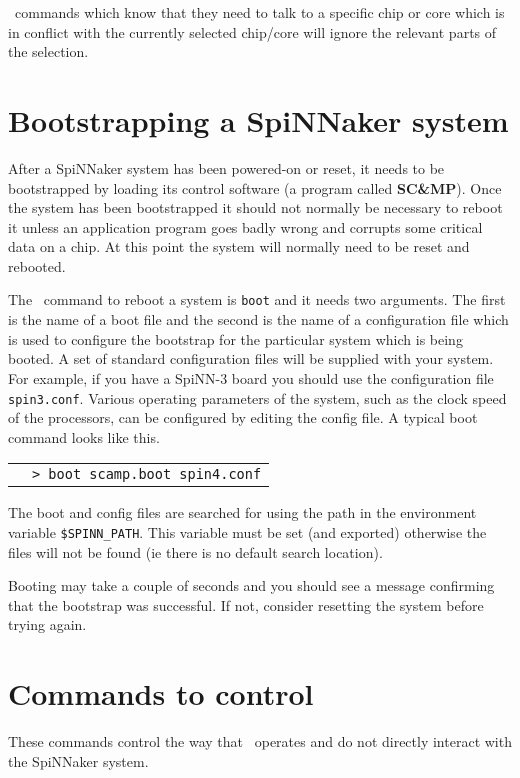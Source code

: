 \ybug\ commands which know that they need to talk to a specific chip or
core which is in conflict with the currently selected chip/core will
ignore the relevant parts of the selection.

\section{Bootstrapping a SpiNNaker system}

After a SpiNNaker system has been powered-on or reset, it needs to be
bootstrapped by loading its control software (a program
called \textbf{SC\&MP}). Once the system has been bootstrapped it
should not normally be necessary to reboot it unless an application
program goes badly wrong and corrupts some critical data on a chip. At
this point the system will normally need to be reset and rebooted.

The \ybug\ command to reboot a system is \texttt{boot} and it needs two
arguments. The first is the name of a boot file and the second is the
name of a configuration file which is used to configure the bootstrap
for the particular system which is being booted. A set of standard
configuration files will be supplied with your system. For example, if
you have a SpiNN-3 board you should use the configuration file
\texttt{spin3.conf}. Various operating parameters of the system, such
as the clock speed of the processors, can be configured by editing
the config file. A typical boot command looks like this.

\begin{tabular}{p{1cm} p{12cm}}
& \texttt{> boot scamp.boot spin4.conf}
\end{tabular}

The boot and config files are searched for using the path in the
environment variable \texttt{\$SPINN\_PATH}. This variable must be set
(and exported) otherwise the files will not be found (ie there is no
default search location).

Booting may take a couple of seconds and you should see a message
confirming that the bootstrap was successful. If not, consider
resetting the system before trying again.

\section{Commands to control \ybug}

These commands control the way that \ybug\ operates and do not directly
interact with the SpiNNaker system.

